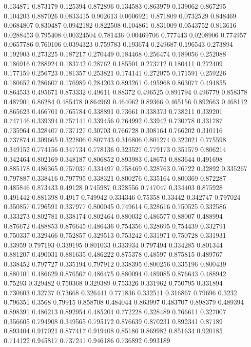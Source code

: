0.134871 0.873179
0.125394 0.872896
0.134583 0.863979
0.139062 0.867295
0.104203 0.887026
0.0833415 0.902613
0.0606921 0.871809
0.0732529 0.848469
0.0684807 0.830487
0.0942182 0.822508
0.104861 0.831009
0.0543752 0.813616
0.0288453 0.795408
0.00324504 0.781436
0.00469706 0.777443
0.0208906 0.774957
0.0657786 0.760106
0.0394323 0.759783
0.193674 0.249687
0.196543 0.273894
0.192903 0.273225
0.187217 0.270449
0.184468 0.256474
0.189056 0.252088
0.186916 0.288924
0.183742 0.28762
0.185501 0.273712
0.180411 0.272409
0.177159 0.256723
0.181357 0.253821
0.174141 0.272075
0.171591 0.259226
0.180652 0.286607
0.176989 0.284203
0.893261 0.495968
0.863077 0.494855
0.864533 0.495671
0.873332 0.49611
0.88372 0.496525
0.891794 0.496779
0.858378 0.487901
0.86284 0.485478
0.864969 0.464062
0.89366 0.465156
0.892663 0.468112
0.865623 0.466701
0.765784 0.338891
0.73661 0.338373
0.738211 0.339201
0.747146 0.339394
0.757141 0.339456
0.764992 0.33942
0.730778 0.331787
0.735964 0.328407
0.737127 0.30703
0.766728 0.308164
0.766202 0.310116
0.737874 0.309665
0.322806 0.807743
0.316806 0.801274
0.322021 0.775598
0.349152 0.774156
0.347734 0.778136
0.323527 0.779173
0.351579 0.806214
0.342464 0.802169
0.348187 0.806852
0.893983 0.48673
0.883644 0.491698
0.885178 0.486365
0.757037 0.334497
0.758469 0.328763
0.76722 0.32892
0.335267 0.797887
0.338416 0.797795
0.338321 0.800276
0.335164 0.800369
0.872287 0.485846
0.873433 0.49128
0.745987 0.328556
0.747047 0.334403
0.875928 0.491442
0.881398 0.4917
0.749942 0.334346
0.75358 0.33442
0.342747 0.797024
0.350857 0.796591
0.337977 0.800045
0.749614 0.328616
0.750525 0.332586
0.333273 0.802781
0.338174 0.802464
0.880032 0.486577
0.88007 0.488994
0.876672 0.488853
0.876645 0.486436
0.754356 0.328695
0.754439 0.332791
0.750337 0.329466
0.752857 0.329513
0.753242 0.331971
0.750728 0.331931
0.33959 0.797193
0.339195 0.801033
0.333934 0.797494
0.334285 0.801344
0.881207 0.490031
0.881635 0.486222
0.875378 0.48597
0.875815 0.489767
0.338452 0.797727
0.335194 0.797912
0.338395 0.800256
0.335196 0.800439
0.880101 0.486629
0.876567 0.486475
0.880094 0.489085
0.876643 0.488942
0.75293 0.329482
0.750368 0.329389
0.753326 0.331962
0.750795 0.331894
0.730603 0.32737
0.73668 0.326441
0.771836 0.332511
0.316867 0.79696
0.3232 0.796351
0.3568 0.79915
0.858708 0.484044
0.863997 0.483707
0.898379 0.489394
0.898391 0.486213
0.892954 0.485204
0.772228 0.328489
0.766611 0.327007
0.356605 0.794908
0.349565 0.795172
0.876639 0.870231
0.892341 0.87189
0.893404 0.917021
0.877417 0.919408
0.85186 0.869982
0.851634 0.920185
0.714122 0.945817
0.737241 0.946186
0.736892 0.993189
